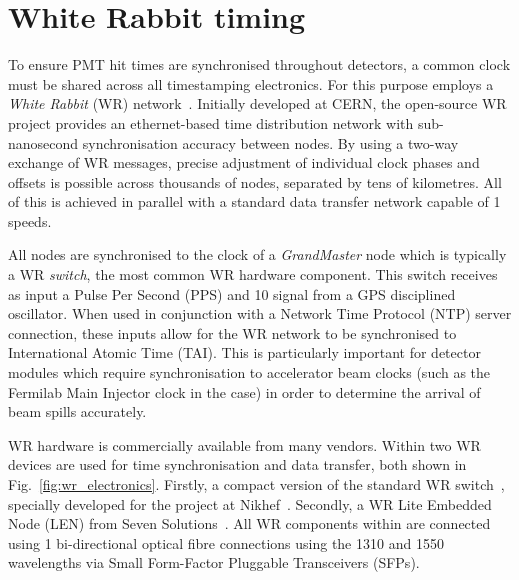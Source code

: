 \section{White Rabbit timing} %
\label{sec:daq_timing} %

To ensure PMT hit times are synchronised throughout \chips detectors, a common clock must be
shared across all timestamping electronics. For this purpose \chips employs a \emph{White Rabbit}
(WR) network~\cite{lipinski2011}. Initially developed at CERN, the open-source WR project provides
an ethernet-based time distribution network with sub-nanosecond synchronisation accuracy between
nodes. By using a two-way exchange of WR messages, precise adjustment of individual clock phases
and offsets is possible across thousands of nodes, separated by tens of kilometres. All of this is
achieved in parallel with a standard data transfer network capable of \unit{1}{}
speeds.

All nodes are synchronised to the clock of a \emph{GrandMaster} node which is typically a WR
\emph{switch}, the most common WR hardware component. This switch receives as input a Pulse Per
Second (PPS) and \unit{10}{} signal from a GPS disciplined oscillator. When used in
conjunction with a Network Time Protocol (NTP) server connection, these inputs allow for the WR
network to be synchronised to International Atomic Time (TAI). This is particularly important for
\chips detector modules which require synchronisation to accelerator beam clocks (such as the
Fermilab Main Injector clock in the \chipsfive case) in order to determine the arrival of beam
spills accurately.

WR hardware is commercially available from many vendors. Within \chipsfive two WR devices are used
for time synchronisation and data transfer, both shown in Fig.~\ref{fig:wr_electronics}. Firstly,
a compact version of the standard WR switch~\cite{wrswitch2020}, specially developed for the
\chips project at Nikhef~\cite{wrchromium2020}. Secondly, a WR Lite Embedded Node (LEN) from Seven
Solutions~\cite{wrlen2020}. All WR components within \chipsfive are connected using
\unit{1}{} bi-directional optical fibre connections using the \unit{1310}{}
and \unit{1550}{} wavelengths via Small Form-Factor Pluggable Transceivers (SFPs).

